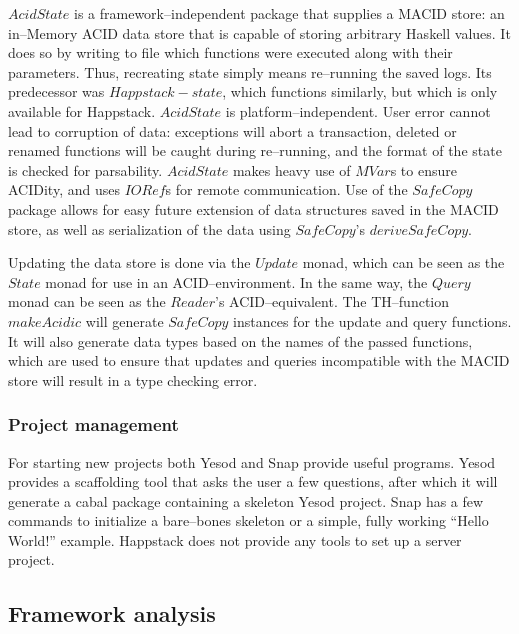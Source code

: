 $ AcidState $ is a framework--independent package that supplies a MACID store: an in--Memory ACID data store that is capable of storing arbitrary Haskell values.
It does so by writing to file which functions were executed along with their parameters. Thus, recreating state simply means re--running the saved logs.
Its predecessor was $ Happstack-state $, which functions similarly, but which is only available for Happstack.
$ AcidState $ is platform--independent.
User error cannot lead to corruption of data: exceptions will abort a transaction, deleted or renamed functions will be caught during re--running, and the format of the state is checked for parsability.
$ AcidState $ makes heavy use of $ MVar $s to ensure ACIDity, and uses $ IORef $s for remote communication.
Use of the $ SafeCopy $ package allows for easy future extension of data structures saved in the MACID store, as well as serialization of the data using $ SafeCopy $'s $ deriveSafeCopy $.

Updating the data store is done via the $ Update $ monad, which can be seen as the $ State $ monad for use in an ACID--environment.
In the same way, the $ Query $ monad can be seen as the $ Reader $'s ACID--equivalent.
The TH--function $ makeAcidic $ will generate $ SafeCopy $ instances for the update and query functions.
It will also generate data types based on the names of the passed functions, which are used to ensure that updates and queries incompatible with the MACID store will result in a type checking error.

\subsubsection{Project management}

For starting new projects both Yesod and Snap provide useful programs.
Yesod provides a scaffolding tool that asks the user a few questions, after which it will generate a cabal package containing a skeleton Yesod project.
Snap has a few commands to initialize a bare--bones skeleton or a simple, fully working ``Hello World!'' example.
Happstack does not provide any tools to set up a server project.

\subsection{Framework analysis}\label{frameworkanalysis}

